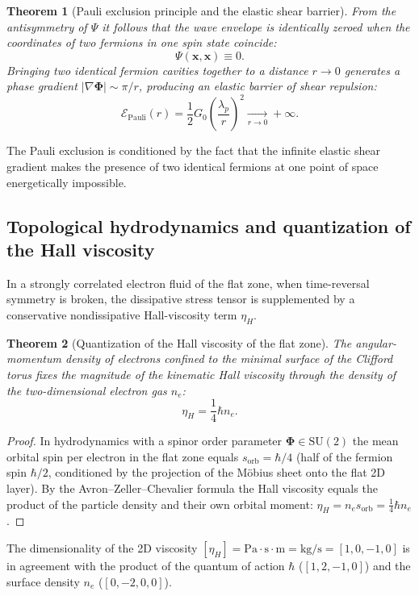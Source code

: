 \documentclass[11pt,a4paper]{article}
\newtheorem{theorem}{Theorem}
\theoremstyle{definition}
\theoremstyle{remark}
\begin{document}
\begin{theorem}[Pauli exclusion principle and the elastic shear barrier]
\label{thm:pauli_exclusion_repulsion}
From the antisymmetry of $\Psi$ it follows that the wave envelope is identically zeroed when the coordinates of two fermions in one spin state coincide:
\begin{equation}
	\Psi(\mathbf{x}, \mathbf{x}) \equiv 0.
\label{eq:pauli_zero_amplitude}
\end{equation}
Bringing two identical fermion cavities together to a distance $r \to 0$ generates a phase gradient $|\nabla\boldsymbol{\Phi}| \sim \pi / r$, producing an elastic barrier of shear repulsion:
\begin{equation}
	\mathcal{E}_{\mathrm{Pauli}}(r) = \frac{1}{2} G_0 \left(\frac{\lambda_p}{r}\right)^2 \xrightarrow[r \to 0]{} +\infty.
\label{eq:pauli_repulsion_energy}
\end{equation}
\end{theorem}
The Pauli exclusion is conditioned by the fact that the infinite elastic shear gradient makes the presence of two identical fermions at one point of space energetically impossible.

\subsection{Topological hydrodynamics and quantization of the Hall viscosity}

In a strongly correlated electron fluid of the flat zone, when time-reversal symmetry is broken, the dissipative stress tensor is supplemented by a conservative nondissipative Hall-viscosity term $\eta_H$.

\begin{theorem}[Quantization of the Hall viscosity of the flat zone]
\label{thm:hall_viscosity_quantization}
    The angular-momentum density of electrons confined to the minimal surface of the Clifford torus fixes the magnitude of the kinematic Hall viscosity through the density of the two-dimensional electron gas $n_e$:
\begin{equation}
    \eta_H = \frac{1}{4} \hbar n_e.
    \label{eq:hall_viscosity_exact}
\end{equation}
\end{theorem}
\begin{proof}
In hydrodynamics with a spinor order parameter $\boldsymbol{\Phi} \in \mathrm{SU}(2)$ the mean orbital spin per electron in the flat zone equals $s_{\mathrm{orb}} = \hbar / 4$ (half of the fermion spin $\hbar/2$, conditioned by the projection of the Möbius sheet onto the flat 2D layer). By the Avron--Zeller--Chevalier formula the Hall viscosity equals the product of the particle density and their own orbital moment: $\eta_H = n_e s_{\mathrm{orb}} = \frac{1}{4} \hbar n_e$.
\end{proof}
The dimensionality of the 2D viscosity $[\eta_H] = \text{Pa}\cdot\text{s}\cdot\text{m} = \text{kg/s} = [1, 0, -1, 0]$ is in agreement with the product of the quantum of action $\hbar$ ($[1, 2, -1, 0]$) and the surface density $n_e$ ($[0, -2, 0, 0]$).
\end{document}
